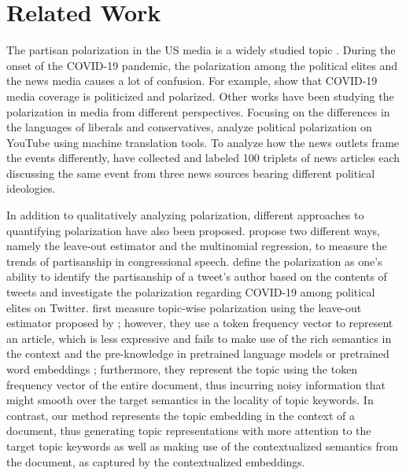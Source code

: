 \documentclass[11pt]{article}
\begin{document}


\section{Related Work}
The partisan polarization in the US media is a widely studied topic \cite{hollander2008tuning, stroud2011niche}. During the onset of the COVID-19 pandemic, the polarization among the political elites and the news media causes a lot of confusion. For example, \citet{hart2020covid19} show that COVID-19 media coverage is politicized and polarized. Other works have been studying the polarization in media from different perspectives. Focusing on the differences in the languages of liberals and conservatives, \citet{khudabukhsh2020we} analyze political polarization on YouTube using machine translation tools. To analyze how the news outlets frame the events differently, \citet{fan2019plain} have collected and labeled 100 triplets of news articles each discussing the same event from three news sources bearing different political ideologies.

In addition to qualitatively analyzing polarization, different approaches to quantifying polarization have also been proposed. 
\citet{gentzkow2019measuring} propose two different ways, namely the leave-out estimator and the multinomial regression, to measure the trends of partisanship in congressional speech. \citet{green2020elusive} define the polarization as one’s ability to identify the partisanship of a tweet’s author based on the contents of tweets and investigate the polarization regarding COVID-19 among political elites on Twitter. \citet{demszky2019analyzing} first measure topic-wise polarization using the leave-out estimator proposed by \cite{gentzkow2019measuring}; however, they use a token frequency vector to represent an article, which is less expressive and fails to make use of the rich semantics in the context and the pre-knowledge in
pretrained language models \cite{devlin2018bert, liu2019roberta} or pretrained word embeddings \cite{mikolov2013distributed, pennington2014glove}; furthermore, they represent the topic using the token frequency vector of the entire document, thus incurring noisy information that might smooth over the target semantics in the locality of topic keywords. In contrast, our method represents the topic embedding in the context of a document, thus generating topic representations with more attention to the target topic keywords as well as making use of the contextualized semantics from the document, as captured by the contextualized embeddings.
\end{document}
